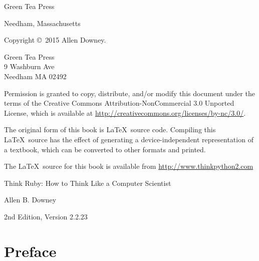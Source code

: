 \documentclass[10pt]{book}
\newcommand{\thetitle}{Think Ruby: How to Think Like a Computer Scientist}
\newcommand{\theversion}{2nd Edition, Version 2.2.23}
\newcommand{\thedate}{}
\begin{document}
\begin{latexonly}
\begin{flushright}
{\Large Green Tea Press}

{\small Needham, Massachusetts}

\vfill

\end{flushright}


\pagebreak
\thispagestyle{empty}

{\small
Copyright \copyright ~2015 Allen Downey.


\vspace{0.2in}

\begin{flushleft}
Green Tea Press       \\
9 Washburn Ave        \\
Needham MA 02492
\end{flushleft}

Permission is granted to copy, distribute, and/or modify this document
under the terms of the Creative Commons Attribution-NonCommercial 3.0 Unported
License, which is available at \url{http://creativecommons.org/licenses/by-nc/3.0/}.

The original form of this book is \LaTeX\ source code.  Compiling this
\LaTeX\ source has the effect of generating a device-independent
representation of a textbook, which can be converted to other formats
and printed.

The \LaTeX\ source for this book is available from
\url{http://www.thinkpython2.com}

\vspace{0.2in}

} %

\end{latexonly}



\begin{htmlonly}


{\Large \thetitle}

{\large Allen B. Downey}

\theversion

\thedate

\setcounter{chapter}{-1}

\end{htmlonly}

\fi


\chapter{Preface}
\end{document}
